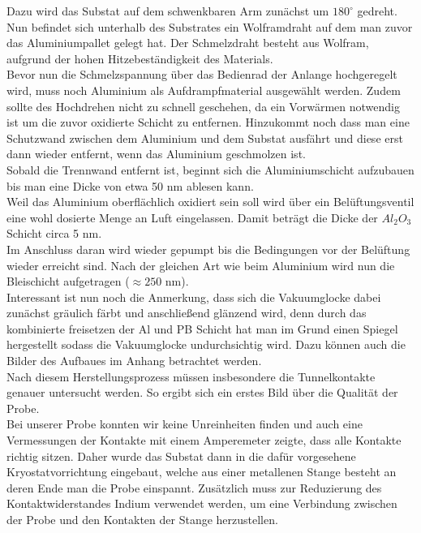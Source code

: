 \documentclass[twoside,        %
               BCOR12mm,       %
               english,ngerman, %
               fleqn,headsepline=false,footsepline=false
              ]{MFPREPORT}
\begin{document}
Dazu wird das Substat auf dem schwenkbaren Arm zunächst um $180^{\circ}$ gedreht. 
Nun befindet sich unterhalb des Substrates ein Wolframdraht auf dem man zuvor das Aluminiumpallet gelegt hat.
Der Schmelzdraht besteht aus Wolfram, aufgrund der hohen Hitzebeständigkeit des Materials.
\\
Bevor nun die Schmelzspannung über das Bedienrad der Anlange hochgeregelt wird, muss noch Aluminium als Aufdrampfmaterial ausgewählt werden. Zudem sollte des Hochdrehen nicht zu schnell geschehen, da ein Vorwärmen notwendig ist um die zuvor oxidierte Schicht zu entfernen. Hinzukommt noch dass man eine Schutzwand zwischen dem Aluminium und dem Substat ausfährt und diese erst dann wieder entfernt, wenn das Aluminium geschmolzen ist.
\\
Sobald die Trennwand entfernt ist, beginnt sich die Aluminiumschicht aufzubauen bis man eine Dicke von etwa 50 nm ablesen kann.
\\
Weil das Aluminium oberflächlich oxidiert sein soll wird über ein Belüftungsventil eine wohl dosierte Menge an Luft eingelassen.
Damit beträgt die Dicke der $Al_{2}O_{3}$ Schicht circa 5 nm.
\\
Im Anschluss daran wird wieder gepumpt bis die Bedingungen vor der Belüftung wieder erreicht sind. Nach der gleichen Art wie beim Aluminium wird nun die Bleischicht aufgetragen ($\approx 250 \text{ nm}$).
\\
Interessant ist nun noch die Anmerkung, dass sich die Vakuumglocke dabei zunächst gräulich färbt und anschließend glänzend wird, denn durch das kombinierte freisetzen der Al und PB Schicht hat man im Grund einen Spiegel hergestellt sodass die Vakuumglocke undurchsichtig wird.
Dazu können auch die Bilder des Aufbaues im Anhang betrachtet werden.
\\
Nach diesem Herstellungsprozess müssen insbesondere die Tunnelkontakte genauer untersucht werden. So ergibt sich ein erstes Bild über die Qualität der Probe.
\\
Bei unserer Probe konnten wir keine Unreinheiten finden und auch eine Vermessungen der Kontakte mit einem Amperemeter zeigte, dass alle Kontakte richtig sitzen.
Daher wurde das Substat dann in die dafür vorgesehene Kryostatvorrichtung eingebaut, welche aus einer metallenen Stange besteht an deren Ende man die Probe einspannt.
Zusätzlich muss zur Reduzierung des Kontaktwiderstandes Indium verwendet werden, um eine Verbindung zwischen der Probe und den Kontakten der Stange herzustellen.
\end{document}

